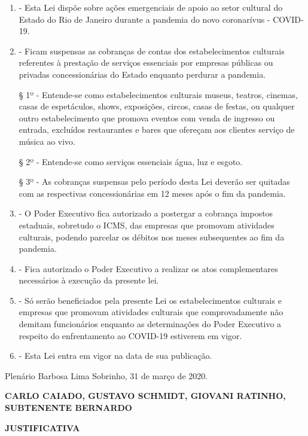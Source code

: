 \documentclass[10pt]{article}
\begin{document}
\begin{enumerate}[label=Art. \arabic*\textdegree]
\item - Esta Lei dispõe sobre ações emergenciais de apoio ao setor cultural do Estado do Rio de Janeiro durante a pandemia do novo coronarívus - COVID-19.

\item - Ficam suspensas as cobranças de contas dos estabelecimentos culturais referentes à prestação de serviços essenciais por empresas públicas ou privadas concessionárias do Estado enquanto perdurar a pandemia.

§ 1º - Entende-se como estabelecimentos culturais museus, teatros, cinemas, casas de espetáculos, shows, exposições, circos, casas de festas, ou qualquer outro estabelecimento que promova eventos com venda de ingresso ou entrada, excluídos restaurantes e bares que ofereçam aos clientes serviço de música ao vivo.

§ 2º - Entende-se como serviços essenciais água, luz e esgoto.

§ 3º - As cobranças suspensas pelo período desta Lei deverão ser quitadas com as respectivas concessionárias em 12 meses após o fim da pandemia.

\item - O Poder Executivo fica autorizado a postergar a cobrança impostos estaduais, sobretudo o ICMS, das empresas que promovam atividades culturais, podendo parcelar os débitos nos meses subsequentes ao fim da pandemia. 

\item - Fica autorizado o Poder Executivo a realizar os atos complementares necessários à execução da presente lei.

\item - Só serão beneficiados pela presente Lei os estabelecimentos culturais e empresas que promovam atividades culturais que comprovadamente não demitam funcionários enquanto as determinações do Poder Executivo a respeito do enfrentamento ao COVID-19 estiverem em vigor. 

\item - Esta Lei entra em vigor na data de sua publicação.

\end{enumerate}




\begin{center}
  Plenário Barbosa Lima Sobrinho, 31 de março de 2020.

   \bigskip

  \textbf{ CARLO CAIADO, GUSTAVO SCHMIDT, GIOVANI RATINHO, SUBTENENTE BERNARDO}

  \bigskip

  \textbf{JUSTIFICATIVA}
  \bigskip

\end{center}
\end{document}
